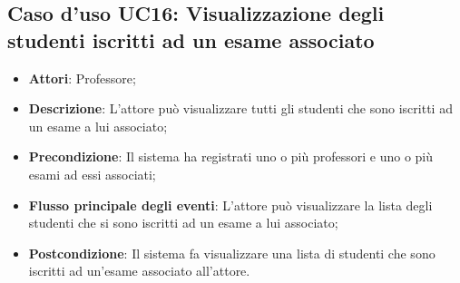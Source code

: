 \subsection{Caso d'uso \texorpdfstring{UC16}{UC16}: Visualizzazione degli studenti iscritti ad un esame associato}
\begin{itemize}
	\item \textbf{Attori}: Professore;
	\item \textbf{Descrizione}: L'attore può visualizzare tutti gli studenti che sono iscritti ad un esame a lui associato;
	\item \textbf{Precondizione}: Il sistema ha registrati uno o più professori e uno o più esami ad essi associati;
	\item \textbf{Flusso principale degli eventi}: L'attore può visualizzare la lista degli studenti che si sono iscritti ad un esame a lui associato;
	\item \textbf{Postcondizione}: Il sistema fa visualizzare una lista di studenti che sono iscritti ad un'esame associato all'attore.
\end{itemize}
